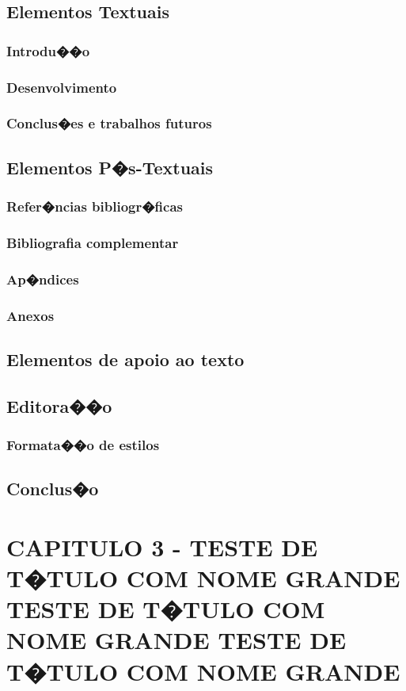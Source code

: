 \documentclass[pnumromarab, normaltoc, a4paper, 12pt]{abnt}
\begin{document}
\section{Elementos Textuais}

\subsection{Introdu��o}
\subsection{Desenvolvimento}
\subsection{Conclus�es e trabalhos futuros}
\section{Elementos P�s-Textuais}
\subsection{Refer�ncias bibliogr�ficas}
\subsection{Bibliografia complementar}
\subsection{Ap�ndices}
\subsection{Anexos}
\section{Elementos de apoio ao texto}
\section{Editora��o}
\subsection{Formata��o de estilos}
\section{Conclus�o}
\chapter{CAPITULO 3 - TESTE DE T�TULO COM NOME GRANDE TESTE DE T�TULO COM NOME
GRANDE TESTE DE T�TULO COM NOME GRANDE}
\end{document}
